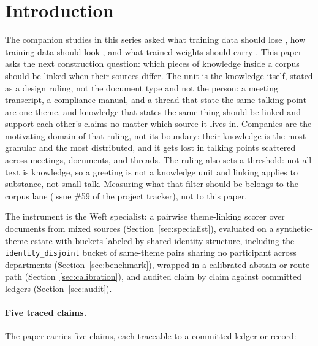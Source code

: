 \documentclass{article}
\begin{document}
\section{Introduction}
\label{sec:intro}

The companion studies in this series asked what training data should lose \citep{ardiyansyah2026extraction}, how training data should look \citep{ardiyansyah2026graphcorpus}, and what trained weights should carry \citep{ardiyansyah2026localtraining}. This paper asks the next construction question: which pieces of knowledge inside a corpus should be linked when their sources differ. The unit is the knowledge itself, stated as a design ruling, not the document type and not the person: a meeting transcript, a compliance manual, and a thread that state the same talking point are one theme, and knowledge that states the same thing should be linked and support each other's claims no matter which source it lives in. Companies are the motivating domain of that ruling, not its boundary: their knowledge is the most granular and the most distributed, and it gets lost in talking points scattered across meetings, documents, and threads. The ruling also sets a threshold: not all text is knowledge, so a greeting is not a knowledge unit and linking applies to substance, not small talk. Measuring what that filter should be belongs to the corpus lane (issue \#59 of the project tracker), not to this paper.

The instrument is the Weft specialist: a pairwise theme-linking scorer over documents from mixed sources (Section~\ref{sec:specialist}), evaluated on a synthetic-theme estate with buckets labeled by shared-identity structure, including the \texttt{identity\_disjoint} bucket of same-theme pairs sharing no participant across departments (Section~\ref{sec:benchmark}), wrapped in a calibrated abstain-or-route path (Section~\ref{sec:calibration}), and audited claim by claim against committed ledgers (Section~\ref{sec:audit}).

\paragraph{Five traced claims.}
The paper carries five claims, each traceable to a committed ledger or record:
\end{document}
